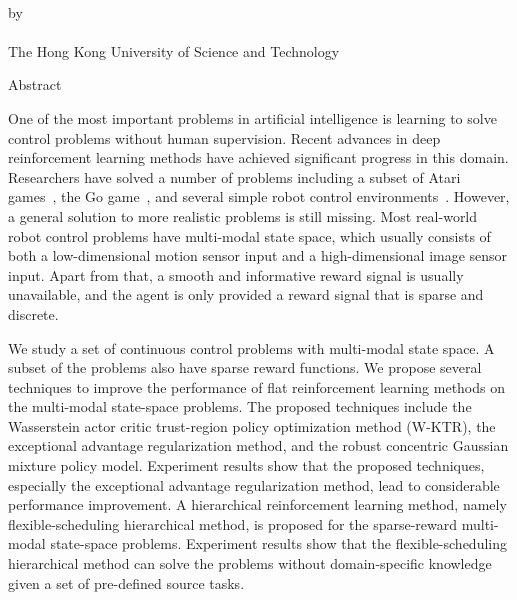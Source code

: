 \begin{center}
{\Large \thesistitle}\\
\vspace{20mm}
by \thesisauthor\\
\vspace{15mm}
\departmentname\\
\vspace{10mm}
The Hong Kong University of Science and Technology
\end{center}
\vspace{8mm}
\begin{center}
Abstract
\end{center}
One of the most important problems in artificial intelligence is learning to solve control problems without human supervision. Recent advances in deep reinforcement learning methods have achieved significant progress in this domain. Researchers have solved a number of problems including a subset of Atari games~\cite{mnih2015human}, the Go game~\cite{silver2016mastering}, and several simple robot control environments~\cite{duan2016benchmarking}.  However, a general solution to more realistic problems is still missing. Most real-world robot control problems have multi-modal state space, which usually consists of both a low-dimensional motion sensor input and a high-dimensional image sensor input. Apart from that, a smooth and informative reward signal is usually unavailable, and the agent is only provided a reward signal that is sparse and discrete.

We study a set of continuous control problems with multi-modal state space. A subset of the problems also have sparse reward functions. We propose several techniques to improve the performance of flat reinforcement learning methods on the multi-modal state-space problems. The proposed techniques include the Wasserstein actor critic trust-region policy optimization method (W-KTR), the exceptional advantage regularization method, and the robust concentric Gaussian mixture policy model. Experiment results show that the proposed techniques, especially the exceptional advantage regularization method, lead to considerable performance improvement. A hierarchical reinforcement learning method, namely flexible-scheduling hierarchical method, is proposed for the sparse-reward multi-modal state-space problems. Experiment results show that the flexible-scheduling hierarchical method can solve the problems without domain-specific knowledge given a set of pre-defined source tasks.

\par
\noindent


